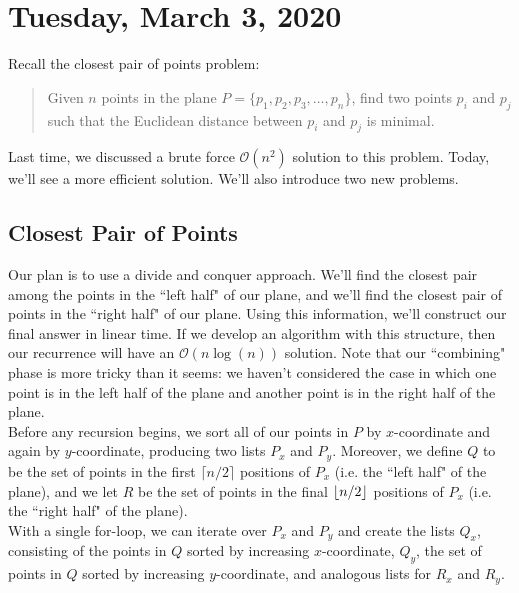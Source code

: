 \newpage
\section{Tuesday, March 3, 2020}

Recall the closest pair of points problem:

\begin{quote}
    Given $n$ points in the plane $P = \{p_1, p_2, p_3, \ldots, p_n\}$, find two points $p_i$ and $p_j$ such that the Euclidean distance between $p_i$ and $p_j$ is minimal. 
\end{quote}


Last time, we discussed a brute force $\mathcal{O}(n^2)$ solution to this problem. Today, we'll see a more efficient solution. We'll also introduce two new problems.

\subsection{Closest Pair of Points}

Our plan is to use a divide and conquer approach. We'll find the closest pair among the points in the ``left half" of our plane, and we'll find the closest pair of points in the ``right half" of our plane. Using this information, we'll construct our final answer in linear time. If we develop an algorithm with this structure, then our recurrence will have an $\mathcal{O}(n\log(n))$ solution. Note that our ``combining" phase is more tricky than it seems: we haven't considered the case in which one point is in the left half of the plane and another point is in the right half of the plane.  \\

Before any recursion begins, we sort all of our points in $P$ by $x$-coordinate and again by $y$-coordinate, producing two lists $P_x$ and $P_y$. Moreover, we define $Q$ to be the set of points in the first $\lceil n/2 \rceil$ positions of $P_x$ (i.e. the ``left half" of the plane), and we let $R$ be the set of points in the final $\left\lfloor n/2 \right\rfloor$ positions of $P_x$ (i.e. the ``right half" of the plane). \\


With a single for-loop, we can iterate over $P_x$ and $P_y$ and create the lists $Q_x$, consisting of the points in $Q$ sorted by increasing $x$-coordinate, $Q_y$, the set of points in $Q$ sorted by increasing $y$-coordinate, and analogous lists for $R_x$ and $R_y.$ \\


